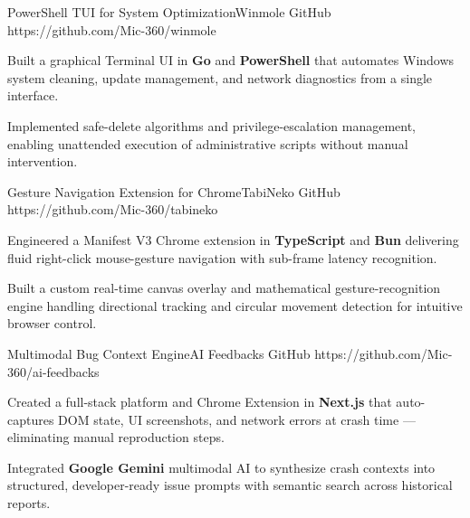 \documentclass{bhaumic}
\begin{document}
\begin{samepage}
\projentry
  {PowerShell TUI for System Optimization}{Winmole}
  {GitHub}
  {https://github.com/Mic-360/winmole}
  {
    \begin{resbullets}
      \item Built a graphical Terminal UI in \textbf{Go} and \textbf{PowerShell} that automates Windows system cleaning, update management, and network diagnostics from a single interface.
      \item Implemented safe-delete algorithms and privilege-escalation management, enabling unattended execution of administrative scripts without manual intervention.
    \end{resbullets}
  }
\end{samepage}

\begin{samepage}
\projentry
  {Gesture Navigation Extension for Chrome}{TabiNeko}
  {GitHub}
  {https://github.com/Mic-360/tabineko}
  {
    \begin{resbullets}
      \item Engineered a Manifest V3 Chrome extension in \textbf{TypeScript} and \textbf{Bun} delivering fluid right-click mouse-gesture navigation with sub-frame latency recognition.
      \item Built a custom real-time canvas overlay and mathematical gesture-recognition engine handling directional tracking and circular movement detection for intuitive browser control.
    \end{resbullets}
  }
\end{samepage}

\begin{samepage}
\projentry
  {Multimodal Bug Context Engine}{AI Feedbacks}
  {GitHub}
  {https://github.com/Mic-360/ai-feedbacks}
  {
    \begin{resbullets}
      \item Created a full-stack platform and Chrome Extension in \textbf{Next.js} that auto-captures DOM state, UI screenshots, and network errors at crash time — eliminating manual reproduction steps.
      \item Integrated \textbf{Google Gemini} multimodal AI to synthesize crash contexts into structured, developer-ready issue prompts with semantic search across historical reports.
    \end{resbullets}
  }
\end{samepage}
\end{document}

